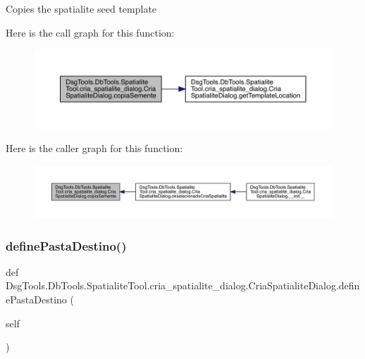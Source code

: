 \begin{DoxyVerb}Copies the spatialite seed template
\end{DoxyVerb}
 Here is the call graph for this function\+:
\nopagebreak
\begin{figure}[H]
\begin{center}
\leavevmode
\includegraphics[width=350pt]{class_dsg_tools_1_1_db_tools_1_1_spatialite_tool_1_1cria__spatialite__dialog_1_1_cria_spatialite_dialog_a3fc898d1ffb8026e1efb72b209e6b4f7_cgraph}
\end{center}
\end{figure}
Here is the caller graph for this function\+:
\nopagebreak
\begin{figure}[H]
\begin{center}
\leavevmode
\includegraphics[width=350pt]{class_dsg_tools_1_1_db_tools_1_1_spatialite_tool_1_1cria__spatialite__dialog_1_1_cria_spatialite_dialog_a3fc898d1ffb8026e1efb72b209e6b4f7_icgraph}
\end{center}
\end{figure}
\mbox{\label{class_dsg_tools_1_1_db_tools_1_1_spatialite_tool_1_1cria__spatialite__dialog_1_1_cria_spatialite_dialog_a4fc8123823f6c35abac0e0270b4f6be6}} 
\subsubsection{\texorpdfstring{define\+Pasta\+Destino()}{definePastaDestino()}}
{\footnotesize\ttfamily def Dsg\+Tools.\+Db\+Tools.\+Spatialite\+Tool.\+cria\+\_\+spatialite\+\_\+dialog.\+Cria\+Spatialite\+Dialog.\+define\+Pasta\+Destino (\begin{DoxyParamCaption}\item[{}]{self }\end{DoxyParamCaption})}

